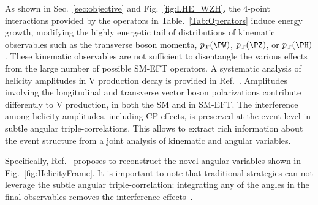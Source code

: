 \documentclass[a4paper,11pt]{article}
\newcommand{\Pb}{{{\Pqb}}\xspace}
\newcommand{\PAb}{{{{\Paqb}}}\xspace}
\renewcommand{\PV}{{{{V}}}\xspace}
\newcommand{\VH}{{{\PV}{\PH}}\xspace}
\begin{document}


As shown in Sec.~\ref{sec:objective} and Fig.~\ref{fig:LHE_WZH}, the 4-point interactions provided by the operators in Table.~\ref{Tab:Operators} induce  energy growth, modifying the highly energetic tail of distributions of kinematic observables such as the transverse boson momenta, $\pt(\PW)$, $\pt(\PZ)$, or $\pt(\PH)$. 
These kinematic observables are not sufficient to disentangle the various effects from the large number of possible SM-EFT operators. 
A systematic analysis of helicity amplitudes in \VH production decay is provided in Ref.~\cite{Banerjee:2019twi}. 
Amplitudes involving the longitudinal and transverse vector boson polarizations contribute differently to \VH production, in both the SM and in SM-EFT. The interference among helicity amplitudes, including CP effects, is preserved at the event level in subtle angular triple-correlations. %
This allows to extract rich information about the event structure from a joint analysis of kinematic and angular variables.

Specifically, Ref.~\cite{Banerjee:2019twi} proposes to reconstruct the novel angular variables shown in Fig.~\ref{fig:HelicityFrame}. 
It is important to note that traditional strategies can not leverage the subtle angular triple-correlation: integrating any of the angles in the final observables removes the interference effects~\cite{Panico:2017frx}.
\end{document}
